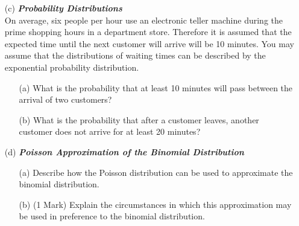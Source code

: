 \begin{itemize}



\item[(c)] \textbf{\textit{Probability Distributions }}\\ On average, six people per hour use an electronic teller machine during the prime shopping hours in a department store. Therefore it is assumed that the expected time until the next customer will arrive will be 10 minutes. You may assume that the distributions of waiting times can be described by the exponential probability distribution.

\begin{itemize}
\item[(a)]  What is the probability that at least 10 minutes will pass between the arrival of two customers?
\item[(b)]  What is the probability that after a customer leaves, another customer does not arrive for at least 20 minutes?
\end{itemize}
\item[(d)] \textbf{\textit{Poisson Approximation of the Binomial Distribution }}
\begin{itemize}
\item[(a)]  Describe how the Poisson distribution can be used to approximate the binomial distribution.
\item[(b)] (1 Mark) Explain the circumstances in which this approximation may be used in preference to the binomial distribution.
\end{itemize}
\end{itemize}



